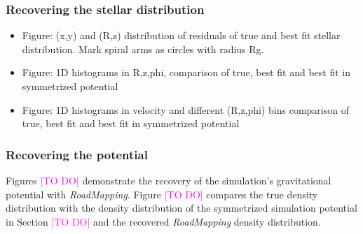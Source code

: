 \documentclass[iop,revtex4,numberedappendix,appendixfloats]{emulateapj}
\newcommand{\RM}{{\sl RoadMapping}}
\newcommand{\Wilma}[1]{\textcolor{Magenta}{#1}}
\begin{document}
\subsubsection{Recovering the stellar distribution}

\begin{itemize}
\item Figure: (x,y) and (R,z) distribution of residuals of true and best fit stellar distribution. Mark spiral arms as circles with radius Rg.
\item Figure: 1D histograms in R,z,phi, comparison of  true, best fit and best fit in symmetrized potential
\item Figure: 1D histograms in velocity and different (R,z,phi) bins comparison of  true, best fit and best fit in symmetrized potential
\end{itemize}

\subsubsection{Recovering the potential}

Figures \Wilma{[TO DO]} demonstrate the recovery of the simulation's gravitational potential with \RM{}. Figure \Wilma{[TO DO]} compares the true density distribution with the density distribution of the symmetrized simulation potential in Section \Wilma{[TO DO]} and the recovered \RM{} density distribution.
\end{document}
